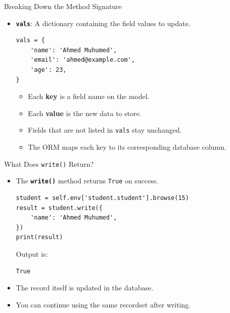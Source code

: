 \begin{frame}[fragile]{Breaking Down the Method Signature}
	\begin{block}{}
		\begin{itemize}
			\item \textbf{\texttt{vals}}: A dictionary containing the field values to update.
\begin{lstlisting}
vals = {
	'name': 'Ahmed Muhumed',
	'email': 'ahmed@example.com',
	'age': 23,
}
\end{lstlisting}
			\begin{itemize}
				\item Each \textbf{key} is a field name on the model.
				\item Each \textbf{value} is the new data to store.
				\item Fields that are not listed in \texttt{vals} stay unchanged.
				\item The ORM maps each key to its corresponding database column.
			\end{itemize}
		\end{itemize}
	\end{block}
\end{frame}

\begin{frame}[fragile]{What Does \texttt{write()} Return?}
	\begin{block}{}
		\begin{itemize}
			\item The \textbf{\texttt{write()}} method returns \texttt{True} on success.
\begin{lstlisting}
student = self.env['student.student'].browse(15)
result = student.write({
	'name': 'Ahmed Muhumed',
})
print(result)
\end{lstlisting}
			Output is:
\begin{lstlisting}
True
\end{lstlisting}
			\item The record itself is updated in the database.
			\item You can continue using the same recordset after writing.
		\end{itemize}
	\end{block}
\end{frame}

